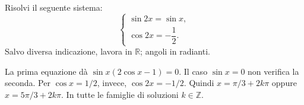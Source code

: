 
\begin{esercizio}
Risolvi il seguente sistema: 
\[
\begin{cases}
\sin 2x=\sin x,\\[2mm]
\cos 2x=-\dfrac{1}{2}.
\end{cases}
\]
Salvo diversa indicazione, lavora in $\mathbb R$; angoli in radianti.
\end{esercizio}

\begin{soluzione}
La prima equazione dà $\sin x(2\cos x-1)=0$. Il caso $\sin x=0$ non verifica la seconda.
Per $\cos x=1/2$, invece, $\cos2x=-1/2$.
Quindi $x=\pi/3+2k\pi$ oppure $x=5\pi/3+2k\pi$. In tutte le famiglie di soluzioni $k\in\mathbb{Z}$.
\end{soluzione}
